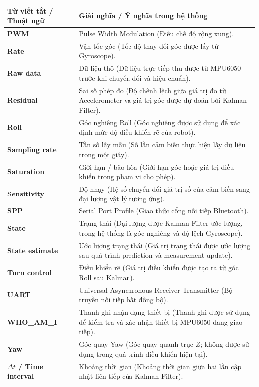 \newpage
\noindent
\begin{tabular}{|p{4.3cm}|p{10.7cm}|}
\hline
\textbf{Từ viết tắt / Thuật ngữ} & \textbf{Giải nghĩa / Ý nghĩa trong hệ thống} \\
\hline
\textbf{PWM} & Pulse Width Modulation (Điều chế độ rộng xung). \\ \hline
\textbf{Rate} & Vận tốc góc (Tốc độ thay đổi góc được lấy từ Gyroscope). \\ \hline
\textbf{Raw data} & Dữ liệu thô (Dữ liệu trực tiếp thu được từ MPU6050 trước khi chuyển đổi và hiệu chuẩn). \\ \hline
\textbf{Residual} & Sai số phép đo (Độ chênh lệch giữa giá trị đo từ Accelerometer và giá trị góc được dự đoán bởi Kalman Filter). \\ \hline
\textbf{Roll} & Góc nghiêng Roll (Góc nghiêng được sử dụng để xác định mức độ điều khiển rẽ của robot). \\ \hline
\textbf{Sampling rate} & Tần số lấy mẫu (Số lần cảm biến thực hiện lấy dữ liệu trong một giây). \\ \hline
\textbf{Saturation} & Giới hạn / bão hòa (Giới hạn góc hoặc giá trị điều khiển trong phạm vi cho phép). \\ \hline
\textbf{Sensitivity} & Độ nhạy (Hệ số chuyển đổi giá trị số của cảm biến sang đại lượng vật lý tương ứng). \\ \hline
\textbf{SPP} & Serial Port Profile (Giao thức cổng nối tiếp Bluetooth). \\ \hline
\textbf{State} & Trạng thái (Đại lượng được Kalman Filter ước lượng, trong hệ thống là góc nghiêng và độ lệch Gyroscope). \\ \hline
\textbf{State estimate} & Ước lượng trạng thái (Giá trị trạng thái được ước lượng sau quá trình prediction và measurement update). \\ \hline
\textbf{Turn control} & Điều khiển rẽ (Giá trị điều khiển được tạo ra từ góc Roll sau Kalman). \\ \hline
\textbf{UART} & Universal Asynchronous Receiver-Transmitter (Bộ truyền nối tiếp bất đồng bộ). \\ \hline
\textbf{WHO\_AM\_I} & Thanh ghi nhận dạng thiết bị (Thanh ghi được sử dụng để kiểm tra và xác nhận thiết bị MPU6050 đang giao tiếp). \\ \hline
\textbf{Yaw} & Góc quay Yaw (Góc quay quanh trục $Z$; không được sử dụng trong quá trình điều khiển hiện tại). \\ \hline
\textbf{$\Delta t$ / Time interval} & Khoảng thời gian (Khoảng thời gian giữa hai lần cập nhật liên tiếp của Kalman Filter). \\ \hline
\end{tabular}
\renewcommand{\arraystretch}{1.0}

\let\cleardoublepage\temp